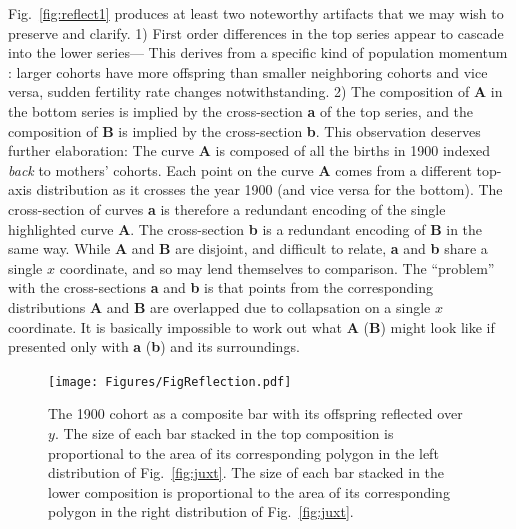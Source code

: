 \documentclass{article}
\begin{document}
Fig.~\ref{fig:reflect1} produces at least two noteworthy artifacts that we may wish to preserve and clarify. 1) First order differences in the top series appear to cascade into the lower series--- This derives from a specific kind of population momentum \citep{keyfitz1971momentum}: larger cohorts have more offspring than smaller neighboring cohorts and vice versa, sudden fertility rate changes notwithstanding. 2) The composition of \textbf{A} in the bottom series is implied by the cross-section \textbf{a} of the top series, and the composition of \textbf{B} is implied by the cross-section \textbf{b}. This observation deserves further elaboration: The curve \textbf{A} is composed of all the births in 1900 indexed \emph{back} to mothers' cohorts. Each point on the curve \textbf{A} comes from a different top-axis distribution as it crosses the year 1900 (and vice versa for the bottom). The cross-section of curves \textbf{a} is therefore a redundant encoding of the single highlighted curve \textbf{A}. The cross-section \textbf{b} is a redundant encoding of \textbf{B} in the same way. While \textbf{A} and \textbf{B} are disjoint, and difficult to relate, \textbf{a} and \textbf{b} share a single $x$ coordinate, and so may lend themselves to comparison. The ``problem'' with the cross-sections \textbf{a} and \textbf{b} is that points from the corresponding distributions \textbf{A} and \textbf{B} are overlapped due to collapsation on a single $x$ coordinate. It is basically impossible to work out what \textbf{A} (\textbf{B}) might look like if presented only with \textbf{a} (\textbf{b}) and its surroundings. 
\pagebreak
\begin{figure}
 \centering
        \texttt{[image: Figures/FigReflection.pdf]}
        \caption{The 1900 cohort as a composite bar with its offspring reflected over $y$. The size of each bar stacked in the top composition is proportional to the area of its corresponding polygon in the left distribution of Fig.~\ref{fig:juxt}. The size of each bar stacked in the lower composition is proportional to the area of its corresponding polygon in the right distribution of Fig.~\ref{fig:juxt}.}
          \label{fig:refl}
\end{figure}
\end{document}
